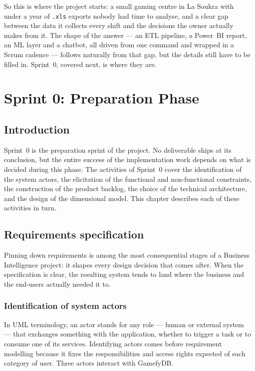 \documentclass[12pt, a4paper]{report}
\begin{document}
So this is where the project starts: a small gaming centre in La Soukra
with under a year of \texttt{.xls} exports nobody had time to analyse,
and a clear gap between the data it collects every shift and the
decisions the owner actually makes from it. The shape of the answer
--- an ETL pipeline, a Power~BI report, an ML layer and a chatbot,
all driven from one command and wrapped in a Scrum cadence ---
follows naturally from that gap, but the details still have to be
filled in. Sprint~0, covered next, is where they are.

\chapter{Sprint 0: Preparation Phase}

\section{Introduction}

Sprint~0 is the preparation sprint of the project. No deliverable ships at
its conclusion, but the entire success of the implementation work depends on
what is decided during this phase. The activities of Sprint~0 cover the
identification of the system actors, the elicitation of the functional and
non-functional constraints, the construction of the product backlog, the
choice of the technical architecture, and the design of the dimensional
model. This chapter describes each of these activities in turn.

\section{Requirements specification}

Pinning down requirements is among the most consequential stages of
a Business Intelligence project: it shapes every design decision
that comes after. When the specification is clear, the resulting
system tends to land where the business and the end-users actually
needed it to.

\subsection{Identification of system actors}

In UML terminology, an actor stands for any role --- human or
external system --- that exchanges something with the application,
whether to trigger a task or to consume one of its services.
Identifying actors comes before requirement modelling because it
fixes the responsibilities and access rights expected of each category
of user. Three actors interact with GamefyDB.
\end{document}
